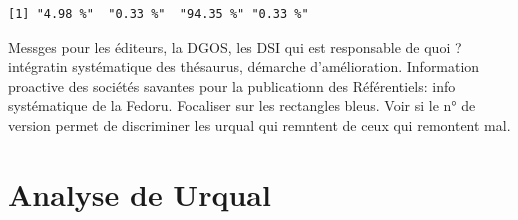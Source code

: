 \documentclass[]{article}
\begin{document}
\begin{verbatim}
[1] "4.98 %"  "0.33 %"  "94.35 %" "0.33 %" 
\end{verbatim}

Messges pour les éditeurs, la DGOS, les DSI qui est responsable de quoi
? intégratin systématique des thésaurus, démarche d'amélioration.
Information proactive des sociétés savantes pour la publicationn des
Référentiels: info systématique de la Fedoru. Focaliser sur les
rectangles bleus. Voir si le n° de version permet de discriminer les
urqual qui remntent de ceux qui remontent mal.

\section{Analyse de Urqual}\label{analyse-de-urqual}
\end{document}
